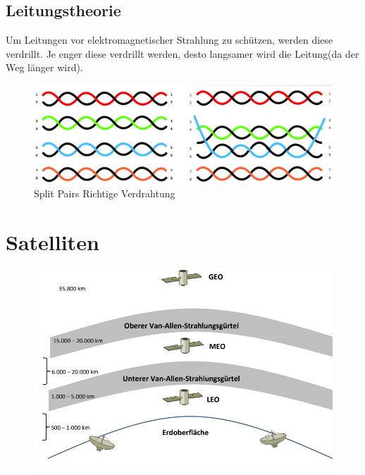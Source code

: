 \documentclass[12pt,a4paper]{article}
\begin{document}
		\subsection{Leitungstheorie}
			Um Leitungen vor elektromagnetischer Strahlung zu schützen, werden diese verdrillt. Je enger diese verdrillt werden, desto langsamer wird die Leitung(da der Weg länger wird).
			\begin{center}
				\begin{figure}[!h]
					\includegraphics[width=\textwidth]{Bilder/verdrillte-kabel.PNG}
					Split Pairs \hspace{0.4\textwidth} Richtige Verdrahtung
				\end{figure}
			\end{center}
		

	\section{Satelliten}
	\begin{center}
		\begin{figure}[!h]
			\includegraphics[width=\textwidth]{Bilder/Satelliten.png}
		\end{figure}
	\end{center}
\end{document}
